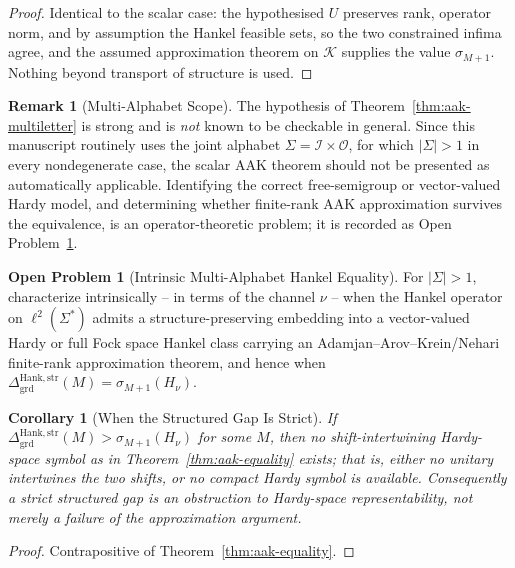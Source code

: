 \documentclass[12pt]{article}
\newtheorem{corollary}[theorem]{Corollary}
\theoremstyle{definition}
\newtheorem{remark}[theorem]{Remark}
\newtheorem{openproblem}[theorem]{Open Problem}
\newcommand{\DHankstr}{\Delta_{\mathrm{grd}}^{\mathrm{Hank,str}}}
\begin{document}
\begin{proof}
Identical to the scalar case: the hypothesised $U$ preserves rank, operator
norm, and by assumption the Hankel feasible sets, so the two constrained
infima agree, and the assumed approximation theorem on $\mathcal K$ supplies
the value $\sigma_{M+1}$.  Nothing beyond transport of structure is used.
\end{proof}

\begin{remark}[Multi-Alphabet Scope]
\label{rem:aak-multialphabet-scope}
The hypothesis of Theorem~\ref{thm:aak-multiletter} is strong and is
\emph{not} known to be checkable in general.  Since this manuscript routinely
uses the joint alphabet $\Sigma=\mathcal I\times\mathcal O$, for which
$|\Sigma|>1$ in every nondegenerate case, the scalar AAK theorem should not be
presented as automatically applicable.  Identifying the correct free-semigroup
or vector-valued Hardy model, and determining whether finite-rank AAK
approximation survives the equivalence, is an operator-theoretic
problem; it is recorded as
Open Problem~\ref{open:hankel-multiletter}.
\end{remark}

\begin{openproblem}[Intrinsic Multi-Alphabet Hankel Equality]
\label{open:hankel-multiletter}
For $|\Sigma|>1$, characterize intrinsically -- in terms of the channel $\nu$
-- when the Hankel operator on $\ell^2(\Sigma^*)$ admits a structure-preserving
embedding into a vector-valued Hardy or full Fock space Hankel class carrying
an Adamjan--Arov--Krein/Nehari finite-rank approximation theorem, and hence
when $\DHankstr(M)=\sigma_{M+1}(H_\nu)$.
\end{openproblem}

\begin{corollary}[When the Structured Gap Is Strict]
\label{cor:hankel-strict}
If $\DHankstr(M)>\sigma_{M+1}(H_\nu)$ for some $M$, then no
\emph{shift-intertwining} Hardy-space symbol as in
Theorem~\ref{thm:aak-equality} exists; that is, either no unitary intertwines
the two shifts, or no compact Hardy symbol is available.  Consequently a strict
structured gap is an obstruction to Hardy-space representability, not merely a
failure of the approximation argument.
\end{corollary}

\begin{proof}
Contrapositive of Theorem~\ref{thm:aak-equality}.
\end{proof}
\end{document}
